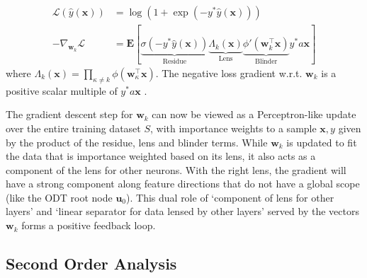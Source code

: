 \documentclass{article}
\theoremstyle{plain}
\theoremstyle{definition}
\theoremstyle{remark}
\newcommand{\E}{{\mathbf E}}
\newcommand{\1}{{\mathbf 1}}
\newcommand{\0}{{\mathbf 0}}
\newcommand{\w}{{\mathbf w}}
\newcommand{\x}{{\mathbf x}}
\newcommand{\bu}{{\mathbf u}}
\renewcommand{\>}{{\rightarrow}}
\begin{document}
\begin{align}
\mathcal{L}(\hat y(\x)) 
&= \log(1+\exp(-y^* \hat y(\x))) \nonumber \\
-\nabla_{\w_k} \mathcal{L} &=  \E [ \underbrace{\sigma (-y^* \hat y(\x))}_{\text{Residue}} 
 \underbrace{ \Lambda_k(\x) }_{\text{Lens}}  \underbrace{\phi'(\w_k ^\top \x)}_{\text{Blinder}} y^* a\x ]\label{eqn:ResidueLensBlinder}
\end{align}
where $\Lambda_k(\x)=\prod_{\kappa \neq k} \phi(\w_\kappa ^\top \x)$. The negative loss gradient w.r.t. $\w_k$ is a positive scalar multiple of $y^*a\x$ . 

The gradient descent step for $\w_k$ can now be viewed as a Perceptron-like update over the entire training dataset $S$, with importance weights to a sample $\x,y$ given by the product of the residue, lens and blinder terms. While $\w_k$ is updated to fit the data that is importance weighted based on its lens, it also acts as a component of the lens for other neurons. 
With the right lens, the gradient will have a strong component along feature directions that do not have a global scope (like the ODT root node $\bu_0$). This dual role of  `component of  lens for other layers' and  `linear separator for data lensed by other layers' served by the vectors $\w_k$ forms a positive feedback loop.

\subsection{Second Order Analysis}
\label{sec:second_order_analysis}
\end{document}

